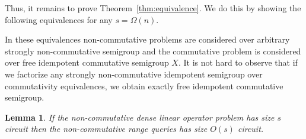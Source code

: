 \documentclass[11pt,letterpaper]{article}
\newtheorem{lemma}{Lemma}
\begin{document}
Thus, it remains to prove Theorem~\ref{thm:equivalence}. We do this by showing the following equivalences for any $s = \Omega(n)$.

\begin{center}
\end{center}

In these equivalences non-commutative problems are considered over arbitrary strongly non-commutative semigroup and the commutative problem is considered over free idempotent commutative semigroup $X$. It is not hard to observe that if we factorize any strongly non-commutative idempotent semigroup over commutativity equivalences, we obtain exactly free idempotent commutative semigroup.




%
%

\begin{lemma} \label{lem:dense_matrices}
If the non-commutative dense linear operator problem has size $s$ circuit then the non-commutative range queries has size $O(s)$ circuit.
\end{lemma}
\end{document}
